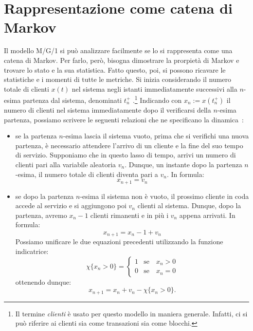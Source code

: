 \section{Rappresentazione come catena di Markov}
Il modello M/G/1 si può analizzare facilmente se lo si rappresenta come una catena di Markov. Per farlo, però, bisogna dimostrare la prorpietà di Markov e trovare lo stato e la sua statistica. Fatto questo, poi, si possono ricavare le statistiche e i momenti di tutte le metriche. Si inizia considerando il numero totale di clienti $x(t)$ nel sistema negli istanti immediatamente successivi alla $n$-esima partenza dal sistema, denominati $t_n^+$%
.\footnote{Il termine \textit{clienti} \`e usato per questo modello in maniera generale. Infatti, ci si può riferire ai clienti sia come transazioni sia come blocchi.} Indicando con $x_n:= x(t_n^+)$ il numero di clienti nel sistema immediatamente dopo il verificarsi della $n$-esima partenza, possiamo scrivere le seguenti relazioni che ne specificano la dinamica~\cite{libro:tele}:
\begin{itemize}
\item se la partenza $n$-esima lascia il sistema vuoto, prima che si verifichi una nuova partenza, \`e necessario attendere l’arrivo di un cliente e la fine del suo tempo di servizio. Supponiamo che in questo lasso di tempo, arrivi un numero di clienti pari alla variabile aleatoria $v_n$. Dunque, un instante dopo la partenza $n$-esima, il numero totale di clienti diventa pari a $v_n$. In formula: \begin{equation} x_{n+1}=v_n \end{equation}
\item se dopo la partenza $n$-esima il sistema non \`e vuoto, il prossimo cliente in coda accede al servizio e si aggiungono poi $v_n$ clienti al sistema. Dunque, dopo la partenza, avremo $x_n-1$ clienti rimanenti e in più i $v_n$ appena arrivati. In formula: \begin{equation} x_{n+1}=x_n-1+v_n \end{equation}
Possiamo unificare le due equazioni precedenti utilizzando la funzione indicatrice:
\begin{equation}\label{eq:chi}\chi \{x_n>0\}=\begin{cases} 1 & \text{se}\quad x_n>0\\ 0 & \text{se}\quad x_n=0 \end{cases}\end{equation}
ottenendo dunque:
\begin{equation}\label{eq:stato} x_{n+1}=x_n+v_n-\chi \{x_n>0\}. \end{equation}
\end{itemize}
